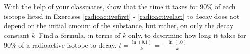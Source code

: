 {With the help of your classmates, show that the time it takes for $90 \%$ of each isotope listed in Exercises \ref{radioactivefirst} - \ref{radioactivelast} to decay does not depend on the initial amount of the substance, but rather, on only the decay constant $k$. Find a formula, in terms of $k$ only, to determine how long it takes for $90 \%$ of a radioactive isotope to decay. }
{$t = \frac{\ln(0.1)}{k} = -\frac{\ln(10)}{k}$}